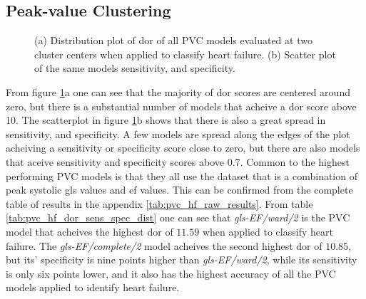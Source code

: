 \newpage

\subsection{Peak-value Clustering}

\begin{figure}[htb]
    \centering
    
    \caption{(a) Distribution plot of \acrshort{dor} of all PVC models evaluated at two cluster centers when applied to classify heart failure.
             (b) Scatter plot of the same models sensitivity, and specificity.}
    \label{fig:pvc_hf_dor_sens_spec_dist}
\end{figure}

From figure \ref{fig:pvc_hf_dor_sens_spec_dist}a one can see that the majority of \acrshort{dor} scores are centered around zero, 
but there is a substantial number of models that acheive a \acrshort{dor} score above 10.
The scatterplot in figure \ref{fig:pvc_hf_dor_sens_spec_dist}b shows that there is also a great spread in sensitivity, and specificity. 
A few models are spread along the edges of the plot acheiving a sensitivity or specificity score close to zero, 
but there are also models that aceive sensitivity and specificity scores above $0.7$.
Common to the highest performing PVC models is that they all use the dataset that is a combination of peak systolic \acrshort{gls} values and \acrshort{ef} values.
This can be confirmed from the complete table of results in the appendix \ref{tab:pvc_hf_raw_results}.
From table \ref{tab:pvc_hf_dor_sens_spec_dist} one can see that \textit{gls-EF/ward/2} is the PVC model that acheives the highest \acrshort{dor} of $11.59$ when applied to classify heart failure.
The \textit{gls-EF/complete/2} model acheives the second highest \acrshort{dor} of $10.85$, but its' specificity is nine points higher than \textit{gls-EF/ward/2}, while its sensitivity is only
six points lower, and it also has the highest accuracy of all the PVC models applied to identify heart failure.
\bigskip


